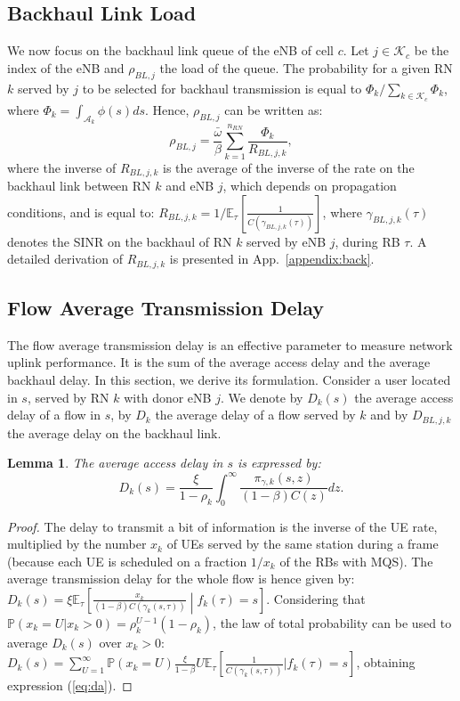 \documentclass[draftcls,onecolumn]{IEEEtran}
\theoremstyle{plain}
\newtheorem{lemma}{Lemma}
\theoremstyle{definition}
\begin{document}
\subsection{Backhaul Link Load} \label{subsec:bhload}
We now focus on the backhaul link queue of the eNB of cell $c$. Let $j \in \mathcal{K}_c$ be the index of the eNB and $\rho_{BL,j}$ the load of the queue. The probability for a given RN $k$ served by $j$ to be selected for backhaul transmission is equal to $\Phi_k/\sum_{k \in \mathcal{K}_c}\Phi_k$, where $\Phi_k = \int_{\mathcal{A}_k}\phi(s){ds}$. Hence, $\rho_{BL,j}$ can be written as:
\begin{equation}
 \rho_{BL,j}=\frac{\bar{\omega}}{\beta} \displaystyle \sum_{k=1}^{n_{RN}} \frac{\Phi_k}{R_{BL,j,k}}, 
\end{equation}
where the inverse of $R_{BL,j,k}$ is the average of the inverse of the rate on the backhaul link between RN $k$ and eNB $j$, which depends on propagation conditions, and is equal to:
$R_{BL,j,k}=1/\mathbb{E}_{\tau}[ \frac{1}{C\left( \gamma_{BL,j,k}(\tau) \right)} ]$,
where $\gamma_{BL,j,k}(\tau)$ denotes the SINR on the backhaul of RN $k$ served by eNB $j$, during RB $\tau$.  
A detailed derivation of $R_{BL,j,k}$ is presented in App.~\ref{appendix:back}. 

\subsection{Flow Average Transmission Delay}
The flow average transmission delay is an effective parameter to measure network uplink performance. It is the sum of the average access delay and the average backhaul delay. In this section, we derive its formulation. Consider a user located in $s$, served by RN $k$ with donor eNB $j$. We denote by $D_k(s)$ the average access delay of a flow in $s$, by $D_k$ the average delay of a flow served by $k$ and by $D_{BL,j,k}$ the average delay on the backhaul link.



\begin{lemma}\label{lm:da}
The average access delay in $s$ is expressed by:
\begin{equation}\label{eq:da}
    D_k(s) =   \frac{\xi }{1-\rho_k}   \int_{0}^{\infty}\frac{\pi_{\gamma,k}(s,z)}{(1-\beta)C(z)}{dz}.
\end{equation}
\end{lemma}
\begin{proof}
The delay to transmit a bit of information is the inverse of the UE rate, multiplied by the number $x_k$ of UEs served by the same station during a frame (because each UE is scheduled on a fraction $1/x_k$ of the RBs with MQS). 
The average transmission delay for the whole flow is hence given by:
$D_k(s)= \xi \mathbb{E}_{\tau}\left[ \frac{x_k}{(1-\beta)C(\gamma_k(s,\tau))}\middle | f_k(\tau)=s \right]$. 
Considering that $\mathbb{P}(x_k=U|x_k>0)=\rho_k^{U-1}(1-\rho_k)$, the law of total probability can be used to average $D_k(s)$ over $x_k>0$:
$D_k(s)=\displaystyle \sum_{U=1}^{\infty}\mathbb{P}(x_k=U)\frac{\xi}{1-\beta} U \mathbb{E}_{\tau}[ \frac{1}{C(\gamma_k(s,\tau))} | f_k(\tau)=s]$,
obtaining expression (\ref{eq:da}).
\end{proof}
\end{document}

